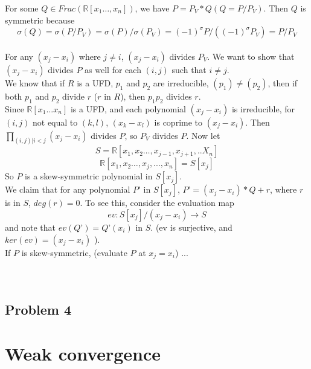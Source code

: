 \documentclass[12pt]{article}
\begin{document}
For some $Q \in Frac(\mathbb{R}[x_1…, x_n])$, we have $P = P_V*Q (Q = P/P_V)$. Then $Q$ is symmetric because 
$$\sigma(Q)  = \sigma(P/P_V ) = \sigma(P)/\sigma(P_V) 
= (-1)^\sigma P / ( (-1)^\sigma P_V) = P/P_V$$\\

For any $(x_j - x_i)$ where $j \neq i$, $(x_j - x_i)$ divides $P_V$. 
We want to show that $(x_j - x_i)$ divides $P$ as well for each $(i,j)$ such that $i \neq j$.\\

We know that if $R$ is a UFD, $p_1$ and $p_2$ are irreducible, $(p_1) \neq (p_2)$, then if both $p_1$ and $p_2$ divide $r$ ($r$ in $R$), then $p_1p_2$ divides $r$.\\

Since $\mathbb{R}[x_1...x_n]$ is a UFD, and each polynomial $(x_j - x_i)$ is irreducible, for $(i, j)$ not equal to $(k, l)$, 
$(x_k - x_l)$ is coprime to $(x_j -x_i)$. Then $\prod_{(i, j)| i < j} (x_j - x_i)$ divides $P$, so $P_V$ divides $P$. Now let
$$S = \mathbb{R}[x_1, x_2…, x_{j-1}, x_{j+1} ,.. X_n]$$
$$\mathbb{R}[x_1, x_2…, x_j,..., x_n] = S[x_j]$$
So $P$ is a skew-symmetric polynomial in $S[x_j]$.\\

We claim that for any polynomial $P’$ in $S[x_j]$, $P’ = (x_j - x_i)*Q + r$, where $r$ is in $S$, $deg(r) = 0$. To see this, consider the evaluation map 
$$ev: S[x_j]/(x_j - x_i) \rightarrow S$$
and note that $ev( Q’ ) = Q’(x_i)$ in $S$. (ev is surjective, and $ker(ev) =  (x_j - x_i)$ ).\\

If $P$ is skew-symmetric, (evaluate $P$ at $x_j = x_i$) ...\\ \\ \\

	\subsection*{Problem 4}


\section{Weak convergence}
\end{document}
